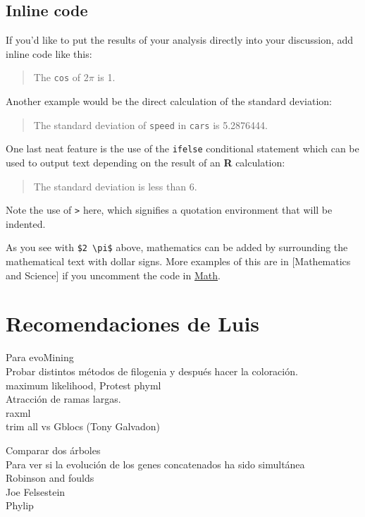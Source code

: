 \documentclass[12pt,twoside]{reedthesis}
\begin{document}
  \subsection{Inline code}\label{inline-code}
  
  If you'd like to put the results of your analysis directly into your
  discussion, add inline code like this:
  
  \begin{quote}
  The \texttt{cos} of \(2 \pi\) is 1.
  \end{quote}
  
  Another example would be the direct calculation of the standard
  deviation:
  
  \begin{quote}
  The standard deviation of \texttt{speed} in \texttt{cars} is 5.2876444.
  \end{quote}
  
  One last neat feature is the use of the \texttt{ifelse} conditional
  statement which can be used to output text depending on the result of an
  \textbf{R} calculation:
  
  \begin{quote}
  The standard deviation is less than 6.
  \end{quote}
  
  Note the use of \texttt{\textgreater{}} here, which signifies a
  quotation environment that will be indented.
  
  As you see with \texttt{\$2\ \textbackslash{}pi\$} above, mathematics
  can be added by surrounding the mathematical text with dollar signs.
  More examples of this are in {[}Mathematics and Science{]} if you
  uncomment the code in \protect\hyperlink{math}{Math}.
  
  \section{Recomendaciones de Luis}\label{recomendaciones-de-luis}
  
  Para evoMining\\
  Probar distintos métodos de filogenia y después hacer la coloración.\\
  maximum likelihood, Protest phyml\\
  Atracción de ramas largas.\\
  raxml\\
  trim all vs Gblocs (Tony Galvadon)
  
  Comparar dos árboles\\
  Para ver si la evolución de los genes concatenados ha sido simultánea\\
  Robinson and foulds\\
  Joe Felsestein\\
  Phylip
  
\end{document}
